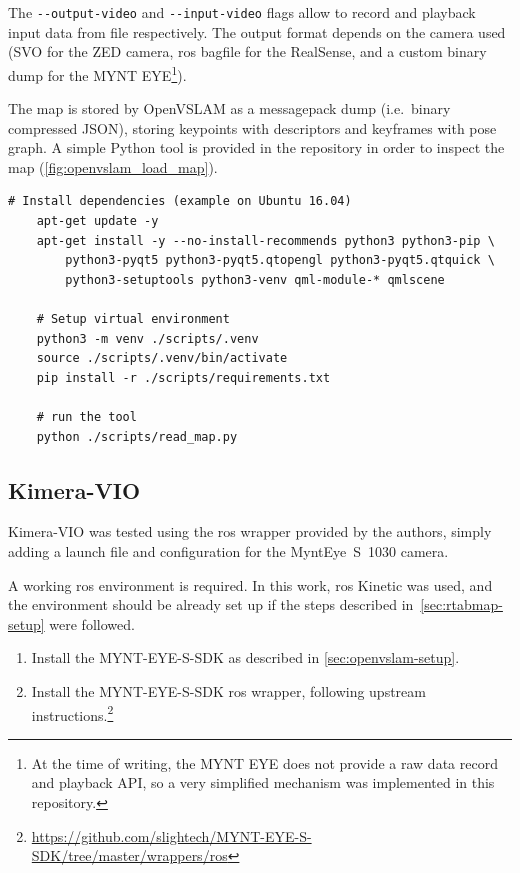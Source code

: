 \documentclass[11pt, letterpaper, twoside]{article}
\begin{document}
The \texttt{-{}-output-video} and \texttt{-{}-input-video} flags allow to
record and playback input data from file respectively. The output format
depends on the camera used (SVO for the ZED camera, \gls{ros} bagfile for the
RealSense, and a custom binary dump for the MYNT EYE\footnote{At the time of
writing, the MYNT EYE does not provide a raw data record and playback API,
so a very simplified mechanism was implemented in this repository.}).

The map is stored by OpenVSLAM as a messagepack dump (i.e.\ binary compressed
JSON), storing keypoints with descriptors and keyframes with pose graph. A
simple Python tool is provided in the repository in order to inspect the map
(\cref{fig:openvslam_load_map}).

\begin{Verbatim}[samepage=true]
    # Install dependencies (example on Ubuntu 16.04)
    apt-get update -y
    apt-get install -y --no-install-recommends python3 python3-pip \
        python3-pyqt5 python3-pyqt5.qtopengl python3-pyqt5.qtquick \
        python3-setuptools python3-venv qml-module-* qmlscene

    # Setup virtual environment
    python3 -m venv ./scripts/.venv
    source ./scripts/.venv/bin/activate
    pip install -r ./scripts/requirements.txt

    # run the tool
    python ./scripts/read_map.py
\end{Verbatim}

\subsection{Kimera-VIO}\label{sec:kimera-setup}

Kimera-VIO was tested using the \gls{ros} wrapper provided by the authors, simply
adding a launch file and configuration for the MyntEye~S~1030 camera.

A working \gls{ros} environment is required. In this work, \gls{ros} Kinetic
was used, and the environment should be already set up if the steps described
in~\cref{sec:rtabmap-setup} were followed.

\begin{enumerate}
    \item Install the MYNT-EYE-S-SDK as described in \cref{sec:openvslam-setup}.

    \item Install the MYNT-EYE-S-SDK \gls{ros} wrapper, following upstream
        instructions.\footnote{\url{https://github.com/slightech/MYNT-EYE-S-SDK/tree/master/wrappers/ros}}
\end{enumerate}
\end{document}
